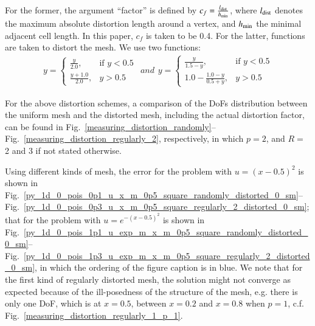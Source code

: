 \documentclass[review,3p]{elsarticle}
\begin{document}
For the former, the argument \enquote{factor} is defined by $c_f = \frac{l_{\rm dist}}{h_{\rm min}}$, where $l_{\rm dist}$ denotes the maximum absolute distortion length around a vertex, and $h_{\rm min}$ the minimal adjacent cell length. In this paper, $c_f$ is taken to be 0.4.
For the latter, functions are taken to distort the mesh. We use two functions: 
\begin{subequations}
  \begin{align}
    y = 
	\begin{cases}
    	\frac{y}{2.0},& \text{if } y < 0.5\\
    	\frac{y+1.0}{2.0},              & y > 0.5
	\end{cases}  \label{regular_mesh_1}
  \end{align}
and  
  \begin{align}
    y = 
	\begin{cases}
    	\frac{y}{1.5-y},& \text{if } y < 0.5\\
    	1.0-\frac{1.0-y}{0.5+y},              & y > 0.5
	\end{cases}  \label{regular_mesh_2}
  \end{align}
\end{subequations}

For the above distortion schemes, a comparison of the DoFs distribution between the uniform mesh and the distorted mesh, including the actual distortion factor, can be found in Fig.~\ref{measuring_distortion_randomly}--Fig.~\ref{measuring_distortion_regularly_2}, respectively, in which $p=2$, and $R=$ 2 and 3 if not stated otherwise. 


Using different kinds of mesh, the error for the problem with $u=(x-0.5)^2$ is shown in Fig.~\ref{py_1d_0_pois_0p1_u_x_m_0p5_square_randomly_distorted_0_sm}--Fig.~\ref{py_1d_0_pois_0p3_u_x_m_0p5_square_regularly_2_distorted_0_sm}; that for the problem with $u=e^{-(x-0.5)^2}$ is shown in Fig.~\ref{py_1d_0_pois_1p1_u_exp_m_x_m_0p5_square_randomly_distorted_0_sm}--Fig.~\ref{py_1d_0_pois_1p3_u_exp_m_x_m_0p5_square_regularly_2_distorted_0_sm}, in which the ordering of the figure caption is in blue.
We note that for the first kind of regularly distorted mesh, the solution might not converge as expected because of the ill-posedness of the structure of the mesh, e.g. there is only one DoF, which is at $x=0.5$, between $x=0.2$ and $x=0.8$ when $p=1$, c.f. Fig.~\ref{measuring_distortion_regularly_1_p_1}.
\end{document}
